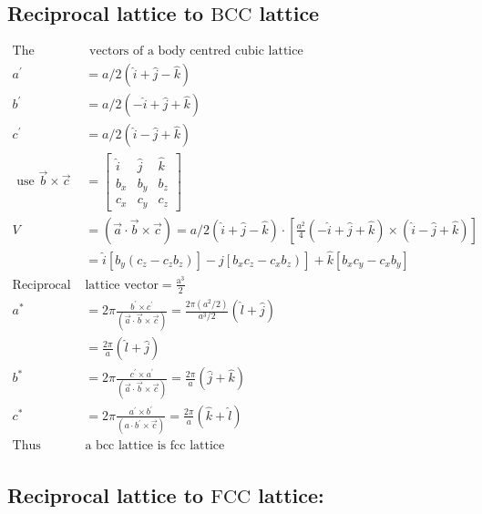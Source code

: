 \subsection{Reciprocal lattice to $\mathrm{BCC}$ lattice}
\begin{align*}
\text{The primitive translation}&\text{ vectors of a body centred cubic lattice}\\
a^{\prime}&=a / 2(\hat{i}+\hat{j}-\hat{k}) \\
b^{\prime}&=a / 2(-\hat{i}+\hat{j}+\hat{k}) \\
c^{\prime}&=a / 2(\hat{i}-\hat{j}+\hat{k}) \\
\text { use } \vec{b} \times \vec{c}&=\left[\begin{array}{lll}\hat{i} & \hat{j} & \hat{k} \\b_{x} & b_{y} & b_{z} \\c_{x} & c_{y} & c_{z}\end{array}\right]\\
V&=(\vec{a} \cdot \vec{b} \times \vec{c})=a / 2(\hat{i}+\hat{j}-\hat{k}) \cdot\left[\frac{a^{2}}{4}(-\hat{i}+\hat{j}+\hat{k}) \times(\hat{i}-\hat{j}+\hat{k})\right] \\
&=\left.\hat{i}\left[b_{y}\left(c_{z}-c_{z} b_{z}\right)\right]-\hat{j}\left[b_{x} c_{z}-c_{x} b_{z}\right)\right]+\hat{k}\left[b_{x} c_{y}-c_{x} b_{y}\right]\\
\text{Reciprocal } &\text{lattice vector}=\frac{\mathrm{a}^{3}}{2}\\
a^{*}&=2 \pi \frac{b^{\prime} \times c^{\prime}}{(\vec{a} \cdot \vec{b} \times \vec{c})}=\frac{2 \pi\left(a^{2} / 2\right)}{a^{3} / 2}(\hat{l}+\hat{j})\\&=\frac{2 \pi}{a}(\hat{l}+\hat{j})\\
b^{*}&=2 \pi \frac{c^{\prime} \times a^{\prime}}{(\vec{a} \cdot \vec{b} \times \vec{c})}=\frac{2 \pi}{a}(\hat{j}+\hat{k})\\
c^{*} &=2 \pi \frac{a^{\prime} \times b^{\prime}}{\left(a\cdot b^{\prime} \times \vec{c}\right)}=\frac{2 \pi}{a}(\hat{k}+\hat{l})\\
\text{Thus reciprocal lattice to }&\text{a bcc lattice is fcc lattice}
\end{align*}


\subsection{Reciprocal lattice to $\mathrm{FCC}$ lattice:}

